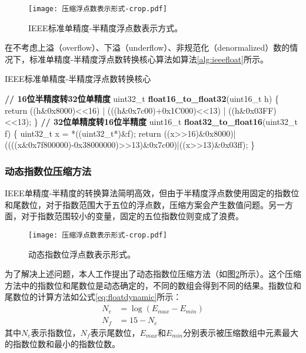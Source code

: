 \begin{figure}[ht]
\centering
\texttt{[image: 压缩浮点数表示形式-crop.pdf]}
\caption{IEEE标准单精度-半精度浮点数表示方式。}
\label{fig:ieeefloathalf}
\end{figure}

在不考虑上溢（overflow）、下溢（underflow）、非规范化（denormalized）数的情况下，标准单精度-半精度浮点数转换核心算法如算法\ref{alg:ieeefloat}所示。
\begin{algorithm}[ht]
\small
\caption{IEEE标准单精度-半精度浮点数转换核心}\label{alg:ieeefloat}
\begin{algorithmic}[1]
\State \textbf{// 16位半精度转32位单精度}
\State uint32\_t \textbf{float16\_to\_float32}(uint16\_t h) \{
\State \quad\quad return ((h\&0x8000)<<16) | (((h\&0x7c00)+0x1C000)<<13) | ((h\&0x03FF)<<13);
\State \}
\State
\State \textbf{// 32位单精度转16位半精度}
\State uint16\_t \textbf{float32\_to\_float16}(uint32\_t f) \{
\State \quad\quad uint32\_t x = *((uint32\_t*)\&f);
\State \quad\quad return ((x>>16)\&0x8000)|((((x\&0x7f800000)-0x38000000)>>13)\&0x7c00)|((x>>13)\&0x03ff);
\State \}
\end{algorithmic}
\end{algorithm}

\subsubsection{动态指数位压缩方法}
IEEE单精度-半精度的转换算法简明高效，但由于半精度浮点数使用固定的指数位和尾数位，对于指数范围大于五位的浮点数，压缩方案会产生数值问题。另一方面，对于指数范围较小的变量，固定的五位指数位则变成了浪费。

\begin{figure}[ht]
\centering
\texttt{[image: 压缩浮点数表示形式-crop.pdf]}
\caption{动态指数位浮点数表示形式。}
\label{fig:ieeefloatdynamic}
\end{figure}

为了解决上述问题，本人工作提出了动态指数位压缩方法（如图\ref{fig:ieeefloatdynamic}所示）。这个压缩方法中的指数位和尾数位是动态确定的，不同的数组会得到不同的结果。指数位和尾数位的计算方法如公式\ref{eq:floatdynamic}所示：
\begin{equation}
  \begin{aligned}
    N_e &= \log(E_{max} - E_{min}) \\
    N_f &= 15 - N_e
  \end{aligned}
  \label{eq:floatdynamic}
\end{equation}
其中$N_e$表示指数位，$N_f$表示尾数位，$E_{max}$和$E_{min}$分别表示被压缩数组中元素最大的指数位数和最小的指数位数。

